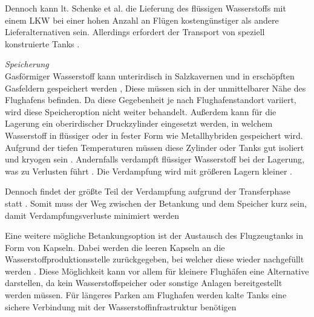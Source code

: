 Dennoch kann lt. Schenke et al. \cite{schenke2024lh2} die Lieferung des flüssigen Wasserstoffs 
mit einem LKW bei einer hohen Anzahl an Flügen kostengünstiger als andere Lieferalternativen sein.
Allerdings erfordert der Transport von  speziell konstruierte Tanks \cite{mulder2019outlook}.

%

\textit{Speicherung}\\
Gasförmiger Wasserstoff kann unterirdisch in Salzkavernen 
und in erschöpften Gasfeldern gespeichert werden \cite{undertaking2022strategic}, 
Diese müssen sich in der unmittelbarer Nähe des Flughafens befinden. 
Da diese Gegebenheit je nach Flughafenstandort variiert, 
wird diese Speicheroption nicht weiter behandelt.
Außerdem kann für die Lagerung ein oberirdischer Druckzylinder eingesetzt werden, 
in welchem Wasserstoff in flüssiger oder in fester Form wie Metallhybriden gespeichert wird.
Aufgrund der tiefen Temperaturen müssen diese Zylinder oder Tanks gut isoliert und kryogen sein \cite{undertaking2022strategic}.
Andernfalls verdampft flüssiger Wasserstoff bei der Lagerung, 
was zu Verlusten führt \cite{undertaking2022strategic}. 
Die Verdampfung wird mit größeren Lagern kleiner \cite{colpan2022fuel}.

Dennoch findet der größte Teil der Verdampfung aufgrund 
der Transferphase statt \cite{undertaking2022strategic}.
Somit muss der Weg zwischen der Betankung und dem Speicher kurz sein, 
damit Verdampfungsverluste minimiert werden \cite{colpan2022fuel}


Eine weitere mögliche Betankungsoption ist der Austausch des Flugzeugtanks in Form von Kapseln. 
Dabei werden die leeren Kapseln an die Wasserstoffproduktionsstelle zurückgegeben, 
bei welcher diese wieder nachgefüllt werden \cite{colpan2022fuel}. 
Diese Möglichkeit kann vor allem für kleinere Flughäfen eine Alternative darstellen, 
da kein Wasserstoffspeicher oder sonstige Anlagen bereitgestellt werden müssen.
Für längeres Parken am Flughafen werden kalte Tanks eine sichere Verbindung 
mit der Wasserstoffinfrastruktur benötigen \cite{colpan2022fuel} %


